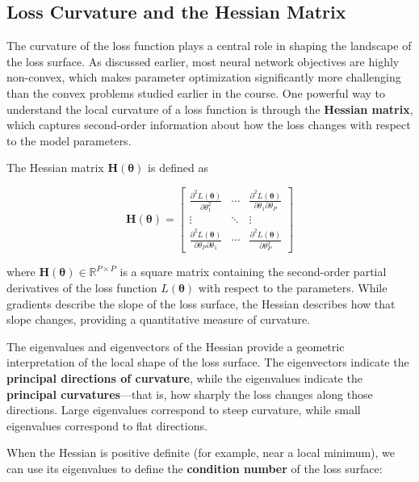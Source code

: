 \documentclass{article}
\begin{document}
\subsection{Loss Curvature and the Hessian Matrix}

The curvature of the loss function plays a central role in shaping the landscape of the loss surface. As discussed earlier, most neural network objectives are highly non-convex, which makes parameter optimization significantly more challenging than the convex problems studied earlier in the course. One powerful way to understand the local curvature of a loss function is through the \textbf{Hessian matrix}, which captures second-order information about how the loss changes with respect to the model parameters.

\noindent The Hessian matrix \( \mathbf{H}(\boldsymbol{\theta}) \) is defined as

\[
\mathbf{H}(\boldsymbol{\theta}) =
\begin{bmatrix}
\frac{\partial^2 L(\boldsymbol{\theta})}{\partial \theta_1^2} & \cdots & \frac{\partial^2 L(\boldsymbol{\theta})}{\partial \theta_1 \partial \theta_P} \\
\vdots & \ddots & \vdots \\
\frac{\partial^2 L(\boldsymbol{\theta})}{\partial \theta_P \partial \theta_1} & \cdots & \frac{\partial^2 L(\boldsymbol{\theta})}{\partial \theta_P^2}
\end{bmatrix}
\]

\noindent where \( \mathbf{H}(\boldsymbol{\theta}) \in \mathbb{R}^{P \times P} \) is a square matrix containing the second-order partial derivatives of the loss function \( L(\boldsymbol{\theta}) \) with respect to the parameters. While gradients describe the slope of the loss surface, the Hessian describes how that slope changes, providing a quantitative measure of curvature.

\medskip

The eigenvalues and eigenvectors of the Hessian provide a geometric interpretation of the local shape of the loss surface. The eigenvectors indicate the \textbf{principal directions of curvature}, while the eigenvalues indicate the \textbf{principal curvatures}—that is, how sharply the loss changes along those directions. Large eigenvalues correspond to steep curvature, while small eigenvalues correspond to flat directions.

\medskip

\noindent When the Hessian is positive definite (for example, near a local minimum), we can use its eigenvalues to define the \textbf{condition number} of the loss surface:
\end{document}
